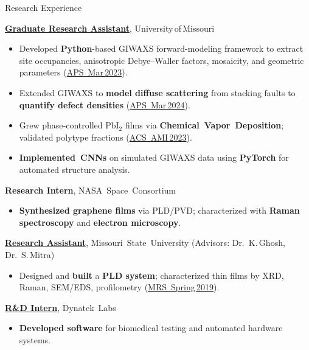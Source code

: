 \begin{rubric}{Research Experience}

  \entry*[2021--Present]%
  \textbf{\href{https://physics.missouri.edu/news/celebrating-student-awards-scholarships-and-recognition}{Graduate Research Assistant}}, University of Missouri%
  \begin{itemize}
\item Developed \textbf{Python}-based GIWAXS forward-modeling framework to extract site occupancies, anisotropic Debye–Waller factors, mosaicity, and geometric parameters
(\href{https://www.researchgate.net/publication/377264935_Quantifying_Orientational_Order_of_PbI2_van_der_Waals_Films_with_X-ray_Diffraction_using_an_Area_Detector}{APS Mar 2023}).
    \item Extended GIWAXS to \textbf{model diffuse scattering} from stacking faults to \textbf{quantify defect densities} (\href{https://meetings.aps.org/Meeting/MAR24/Session/S64.3}{APS Mar 2024}).
    \item Grew phase‑controlled PbI$_2$ films via \textbf{Chemical Vapor Deposition}; validated polytype fractions (\href{https://doi.org/10.1021/acsami.3c14559}{ACS AMI 2023}).
    \item \textbf{Implemented CNNs} on simulated GIWAXS data using \textbf{PyTorch} for automated structure analysis.
  \end{itemize}

  \entry*[2019--2020]%
  \textbf{Research Intern}, NASA Space Consortium%
  \begin{itemize}
    \item \textbf{Synthesized graphene films} via PLD/PVD; characterized with \textbf{Raman spectroscopy} and \textbf{electron microscopy}.
  \end{itemize}

  \entry*[2017--2020]%
  \textbf{\href{https://www.mrs.org/meetings-events/annual-meetings/archive/profile/David-Beckwitt-}{Research Assistant}}, Missouri State University (Advisors: Dr. K. Ghosh, Dr. S. Mitra)%
  \begin{itemize}
    \item Designed and \textbf{built} a \textbf{PLD system}; characterized thin films by XRD, Raman, SEM/EDS, profilometry (\href{https://www.mrs.org/meetings-events/annual-meetings/archive/profile/David-Beckwitt-}{MRS Spring 2019}).
  \end{itemize}

  \entry*[2019]%
  \textbf{\href{https://dynateklabs.com}{R\&D Intern}}, Dynatek Labs%
  \begin{itemize}
    \item \textbf{Developed software} for biomedical testing and automated hardware systems.
  \end{itemize}

\end{rubric}
